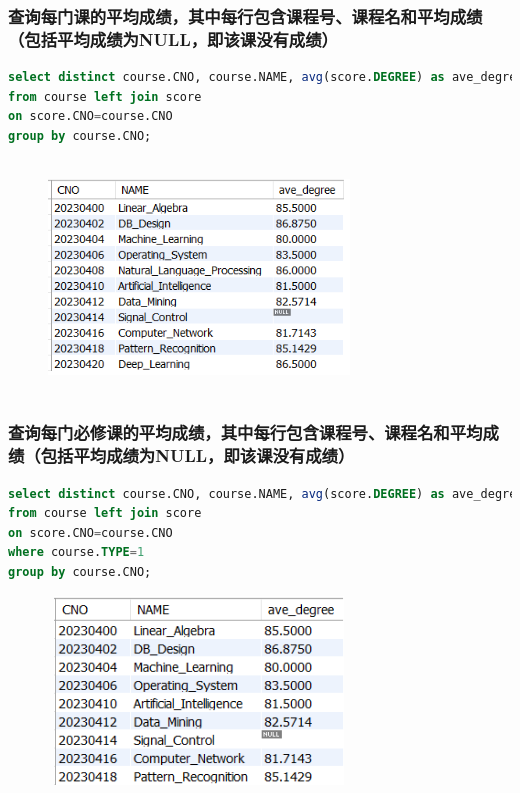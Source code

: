 \documentclass{ctexart}
\begin{document}
\subsubsection{查询每门课的平均成绩，其中每行包含课程号、课程名和平均成绩（包括平均成绩为NULL，即该课没有成绩）}
\begin{lstlisting}[language=sql]
select distinct course.CNO, course.NAME, avg(score.DEGREE) as ave_degree
from course left join score
on score.CNO=course.CNO
group by course.CNO;
\end{lstlisting}
\begin{figure}[H]
	\centering 
	\includegraphics[height=6.2cm,width=8cm]{33.png}
	\end{figure}
\subsubsection{查询每门必修课的平均成绩，其中每行包含课程号、课程名和平均成绩（包括平均成绩为NULL，即该课没有成绩）}
\begin{lstlisting}[language=sql]
select distinct course.CNO, course.NAME, avg(score.DEGREE) as ave_degree
from course left join score
on score.CNO=course.CNO
where course.TYPE=1
group by course.CNO;
\end{lstlisting}
\begin{figure}[H]
	\centering 
	\includegraphics[height=5cm,width=8cm]{34.png}
	\end{figure}
\end{document}
